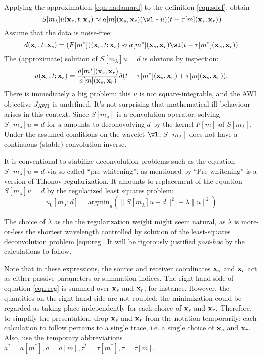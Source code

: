Applying the approximation \ref{eqn:hadamard} to the definition
\ref{eqn:sdef}, obtain
\begin{equation}
  \label{eqn:spwe}
S[m_{\lambda}]u({\bf x}_r,t;{\bf x}_s) \approx a[m]({\bf x}_s,{\bf x}_r) (\wl*u)(t-\tau[m]({\bf x}_s,{\bf x}_r))
\end{equation}
Assume that the data is noise-free:
$$
d({\bf x}_r,t;{\bf x}_s)=(F[m^*]) ({\bf x}_r,t;{\bf x}_s) \approx a[m^*]({\bf x}_s,{\bf x}_r) \wl(t-\tau[m^*]({\bf x}_s,{\bf x}_r))
$$
The (approximate) solution of $S[m_{\lambda}]u=d$ is obvious by inspection:
\begin{equation}
  \label{eqn:notl2}
  u({\bf x}_r,t;{\bf x}_s) = \frac{a[m^*]({\bf x}_s,{\bf x}_r)}{a[m]({\bf x}_s,{\bf x}_r)}\delta(t-\tau[m^*]({\bf x}_s,{\bf x}_r)+\tau[m]({\bf x}_s,{\bf x}_r)).
\end{equation}
There is immediately a big problem: this $u$ is not
square-integrable, and the AWI objective $J_{\rm AWI}$ is
undefined. It's not surprising that mathematical ill-behaviour arises
in this context. Since $S[m_{\lambda}]$ is a convolution operator, solving
$S[m_{\lambda}]u=d$ for $u$ amounts to deconovolving $d$ by the kernel $F[m]$ of
$S[m_{\lambda}]$. Under the assumed conditions on the wavelet $\wl$, $S[m_{\lambda}]$ does
not have a continuous (stable) convolution inverse.


It is conventional to stabilize deconvolution problems such as the
equation $S[m_{\lambda}]u=d$ via so-called ``pre-whitening'', as
mentioned by \cite{Warner:16} ``Pre-whitening'' is a version of
Tihonov regularization. It  amounts to replacement of the equation
$S[m_{\lambda}]u=d$ by the regularized least squares problem: 
\begin{equation}
  \label{eqn:reg}
  u_0[m_{\lambda};d] = \mbox{argmin}_u (\|S[m_{\lambda}]u-d\|^2 + \lambda\|u\|^2)
\end{equation}

The choice of $\lambda$ as the  the regularization weight might seem
natural, as $\lambda$ is more-or-less the shortest wavelength
controlled by solution of the least-squares deconvolution problem
\ref{eqn:reg}. It will be rigorously justified {\em post-hoc} by the
calculations to follow.

Note that in these expressions, the source and receiver coordinates
${\bf x}_s$ and ${\bf x}_r$ act as either passive parameters or
summation indices. The right-hand side of equation \ref{eqn:reg} is
summed over ${\bf x}_s$ and ${\bf x}_r$, for instance. However, the
quantities on the right-hand side are not coupled: the minimization
could be regarded as taking place independently for each choice of
${\bf x}_s$ and ${\bf x}_r$. Therefore, to simplify the presentation,
drop ${\bf x}_s$ and ${\bf x}_r$ from the notation temporarily: each
calculation to follow pertains to a single trace, i.e. a single choice
of ${\bf x}_s$ and ${\bf x}_r$.  Also, use the
temporary abbreviations
$a^*=a[m^*], a=a[m], \tau^*=\tau[m^*], \tau=\tau[m]$.

